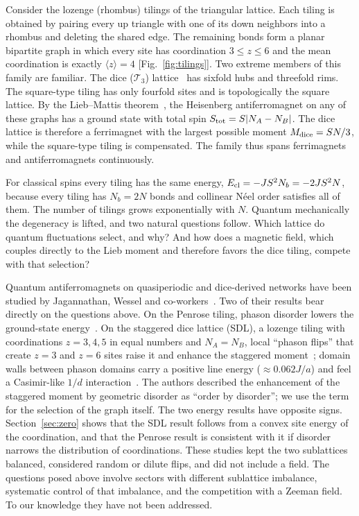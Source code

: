 \documentclass[prb,twocolumn,amsmath,amssymb,floatfix]{revtex4-2}
\newcommand{\Md}{M_{\rm dice}}
\begin{document}
Consider the lozenge (rhombus) tilings of the triangular lattice. Each tiling is obtained by pairing every up triangle with one of its down neighbors into a rhombus and deleting the shared edge. The remaining bonds form a planar bipartite graph in which every site has coordination $3\le z\le6$ and the mean coordination is exactly $\langle z\rangle=4$ [Fig.~\ref{fig:tilings}]. Two extreme members of this family are familiar. The dice ($\mathcal{T}_3$) lattice~\cite{Sutherland1986,Vidal1998} has sixfold hubs and threefold rims. The square-type tiling has only fourfold sites and is topologically the square lattice. By the Lieb--Mattis theorem~\cite{LiebMattis1962,Lieb1989}, the Heisenberg antiferromagnet on any of these graphs has a ground state with total spin $S_{\rm tot}=S|N_A-N_B|$. The dice lattice is therefore a ferrimagnet with the largest possible moment $\Md=SN/3$, while the square-type tiling is compensated. The family thus spans ferrimagnets and antiferromagnets continuously.

For classical spins every tiling has the same energy, $E_{\rm cl}=-JS^2N_b=-2JS^2N$, because every tiling has $N_b=2N$ bonds and collinear N\'eel order satisfies all of them. The number of tilings grows exponentially with $N$. Quantum mechanically the degeneracy is lifted, and two natural questions follow. Which lattice do quantum fluctuations select, and why? And how does a magnetic field, which couples directly to the Lieb moment and therefore favors the dice tiling, compete with that selection?

Quantum antiferromagnets on quasiperiodic and dice-derived networks have been studied by Jagannathan, Wessel and co-workers~\cite{Wessel2003,Jagannathan2006,Szallas2009,Jagannathan2012,Jagannathan2013}. Two of their results bear directly on the questions above. On the Penrose tiling, phason disorder lowers the ground-state energy~\cite{Szallas2009}. On the staggered dice lattice (SDL), a lozenge tiling with coordinations $z=3,4,5$ in equal numbers and $N_A=N_B$, local ``phason flips'' that create $z=3$ and $z=6$ sites raise it and enhance the staggered moment~\cite{Jagannathan2012}; domain walls between phason domains carry a positive line energy ($\approx0.062J/a$) and feel a Casimir-like $1/d$ interaction~\cite{Jagannathan2013}. The authors described the enhancement of the staggered moment by geometric disorder as ``order by disorder''; we use the term for the selection of the graph itself. The two energy results have opposite signs. Section~\ref{sec:zero} shows that the SDL result follows from a convex site energy of the coordination, and that the Penrose result is consistent with it if disorder narrows the distribution of coordinations. These studies kept the two sublattices balanced, considered random or dilute flips, and did not include a field. The questions posed above involve sectors with different sublattice imbalance, systematic control of that imbalance, and the competition with a Zeeman field. To our knowledge they have not been addressed.
\end{document}
